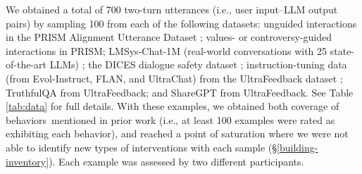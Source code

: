 \documentclass[11pt]{article}
\newcounter{intervention}  %
\newcommand{\cb}{behaviors}
\begin{document}
We obtained a total of 700 two-turn utterances (i.e., user input--LLM output pairs) by sampling 100 from each of the following datasets:
unguided interactions in the PRISM Alignment Utterance Dataset 
\cite{kirk2025prism}; 
values- or controversy-guided interactions in PRISM; 
LMSys-Chat-1M (real-world conversations with 25 state-of-the-art LLMs) \cite{zheng2023lmsyschat1m}; 
the DICES dialogue safety dataset \cite{Aroyo2023-rd}; 
instruction-tuning data (from Evol-Instruct, FLAN, and UltraChat) from the UltraFeedback dataset \cite{pmlr-v235-cui24f};
TruthfulQA from UltraFeedback; 
and ShareGPT from UltraFeedback.
See Table \ref{tab:data} for full details.
With these examples, we obtained both coverage of \cb~mentioned in prior work (i.e., at least 100 examples were rated as exhibiting each behavior), and reached a point of saturation where we were not able to identify new types of interventions with each sample (\S\ref{building-inventory}).
Each example was assessed by two different participants.  
\end{document}

